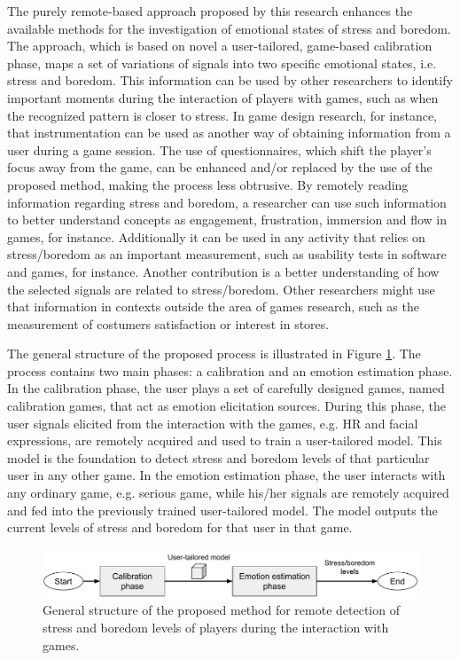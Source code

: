 The purely remote-based approach proposed by this research enhances the available methods for the investigation of emotional states of stress and boredom. The approach, which is based on novel a user-tailored, game-based calibration phase, maps a set of variations of signals into two specific emotional states, i.e. stress and boredom. This information can be used by other researchers to identify important moments during the interaction of players with games, such as when the recognized pattern is closer to stress. In game design research, for instance, that instrumentation can be used as another way of obtaining information from a user during a game session. The use of questionnaires, which shift the player's focus away from the game, can be enhanced and/or replaced by the use of the proposed method, making the process less obtrusive. By remotely reading information regarding stress and boredom, a researcher can use such information to better understand concepts as engagement, frustration, immersion and flow in games, for instance. Additionally it can be used in any activity that relies on stress/boredom as an important measurement, such as usability tests in software and games, for instance. Another contribution is a better understanding of how the selected signals are related to stress/boredom. Other researchers might use that information in contexts outside the area of games research, such as the measurement of costumers satisfaction or interest in stores.

The general structure of the proposed process is illustrated in Figure \ref{fig:research-aim-general}. The process contains two main phases: a calibration and an emotion estimation phase. In the calibration phase, the user plays a set of carefully designed games, named calibration games, that act as emotion elicitation sources. During this phase, the user signals elicited from the interaction with the games, e.g. HR and facial expressions, are remotely acquired and used to train a user-tailored model. This model is the foundation to detect stress and boredom levels of that particular user in any other game. In the emotion estimation phase, the user interacts with any ordinary game, e.g. serious game, while his/her signals are remotely acquired and fed into the previously trained user-tailored model. The model outputs the current levels of stress and boredom for that user in that game.

\begin{figure}[h!]
    \centering
    \includegraphics[width=\textwidth]{Content/figures/research-aim-general}
    \caption{General structure of the proposed method for remote detection of stress and boredom levels of players during the interaction with games.}
    \label{fig:research-aim-general}
\end{figure}

